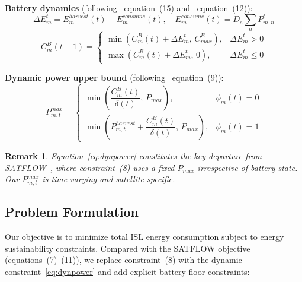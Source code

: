 \documentclass[journal]{IEEEtran}
\newtheorem{remark}{Remark}
\newcommand{\CB}{C^{B}}
\newcommand{\CBmax}{C^{B}_{max}}
\newcommand{\Pmax}{P_{max}}
\newcommand{\Pharvest}{P^{harvest}}
\begin{document}
\textbf{Battery dynamics}
(following~\cite{li2023energy} equation~(15) and~\cite{li2023deepisl} equation~(12)):
\begin{equation}
    \Delta E_m^t = E_m^{harvest}(t) -
    E_m^{consume}(t), \quad
    E_m^{consume}(t)= D_e\sum_{n}P_{m,n}^{t}
    \label{eq:deltaE}
\end{equation}
\begin{equation}
    \CB_m(t{+}1) = \begin{cases}
        \min\!\left(\CB_m(t)+\Delta E_m^t,\,
        \CBmax\right),
        & \Delta E_m^t > 0 \\
        \max\!\left(\CB_m(t)+\Delta E_m^t,\,0
        \right),
        & \Delta E_m^t \leq 0
    \end{cases}
    \label{eq:battery}
\end{equation}

\textbf{Dynamic power upper bound}
(following~\cite{li2023deepisl} equation~(9)):
\begin{equation}
    P_{m,t}^{max} = \begin{cases}
        \min\!\left(\dfrac{\CB_m(t)}{\delta(t)},\,
        \Pmax\right),
        & \phi_m(t)=0\\[6pt]
        \min\!\left(\Pharvest_{m,t}+
        \dfrac{\CB_m(t)}{\delta(t)},\,\Pmax\right),
        & \phi_m(t)=1
    \end{cases}
    \label{eq:dynpower}
\end{equation}

\begin{remark}
Equation~\eqref{eq:dynpower} constitutes the key departure from SATFLOW~\cite{cen2024satflow}, where constraint~(8) uses a fixed $\Pmax$ irrespective of battery state. Our $P_{m,t}^{max}$ is time-varying and satellite-specific.
\end{remark}

\subsection{Problem Formulation}

Our objective is to minimize total ISL energy consumption subject to energy sustainability constraints. Compared with the SATFLOW objective~\cite{cen2024satflow} (equations~(7)--(11)), we replace constraint~(8) with the dynamic constraint~\eqref{eq:dynpower} and add explicit battery floor constraints:
\end{document}
